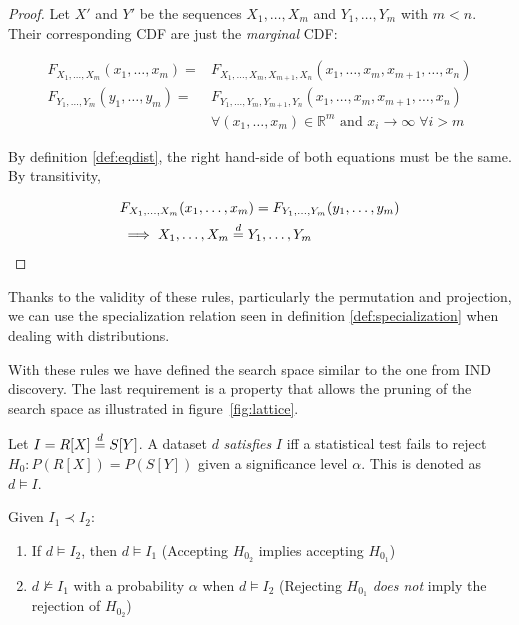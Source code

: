 \begin{proof}
Let $X'$ and $Y'$ be the sequences $X_1,\dots,X_m$ and $Y_1,\dots,Y_m$ with $m < n$.
Their corresponding  \gls{CDF} are just the \emph{marginal} \gls{CDF}:

\begin{equation}
\begin{split}
    F_{X_1,\dots,X_m}(x_1,\dots,x_m) = & F_{X_1,\dots,X_m,X_{m+1},X_n}(x_1,\dots,x_m,x_{m+1},\dots,x_n) \\
    F_{Y_1,\dots,Y_m}(y_1,\dots,y_m) =& F_{Y_1,\dots,Y_m,Y_{m+1},Y_n}(x_1,\dots,x_m,x_{m+1},\dots,x_n)\\
    & \forall (x_1,\dots,x_m) \in \mathbb{R}^m \textrm{ and } x_i \xrightarrow{} \infty \; \forall i > m
\end{split}
\end{equation}

By definition \ref{def:eqdist}, the right hand-side of both equations must be the same.
By transitivity, 

\begin{equation}
\begin{split}
    & F_{X_1,\dots,X_m}(x_1,\dots,x_m) = F_{Y_1,\dots,Y_m}(y_1,\dots,y_m) \\
    & \implies X_1,\dots,X_m \stackrel{d}{=} Y_1,\dots,Y_m
\end{split}
\end{equation}

\end{proof}

Thanks to the validity of these rules, particularly the permutation and projection,
we can use the specialization relation seen in definition \ref{def:specialization}
when dealing with distributions.

With these rules we have defined the search space similar to the one from \gls{IND} discovery.
The last requirement is a property that allows the pruning of the
search space as illustrated in figure~\ref{fig:lattice}.

Let $I = R[X] \stackrel{d}{=} S[Y]$.
A dataset $d$ \emph{satisfies} $I$ iff  a statistical test fails to reject $H_0: P(R[X]) = P(S[Y])$
given a significance level $\alpha$.
This is denoted as $d \models I$.

\begin{property}
    Given $I_1 \prec I_2$:
    
    \label{prop:prob_spec}
    \begin{enumerate}
        \item If $d \models I_2$, then $d \models I_1$ (Accepting $H_{0_2}$ implies accepting $H_{0_1}$\footnotemark)
        \item $d \not\models I_1$ with a probability $\alpha$ when $d \models I_2$
            (Rejecting $H_{0_1}$ \emph{does not} imply the rejection of $H_{0_2}$)
    \end{enumerate}
\end{property}

